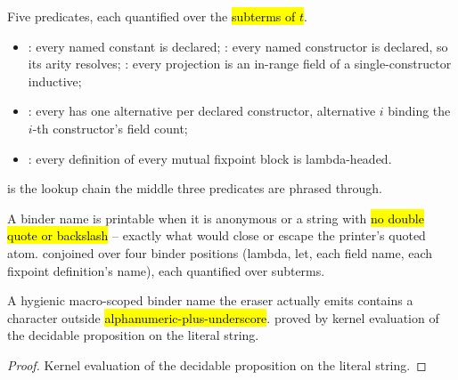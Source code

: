 \begin{definition}
\label{def:NoDangling}
\leanok
{}
 Five predicates, each quantified over the \hl{subterms of $t$}.
\begin{itemize}
\item {}: every named constant is declared; : every named
constructor is declared, so its arity resolves; : every projection is an in-range
field of a single-constructor inductive;
\item {}: every  has one alternative per declared constructor,
alternative $i$ binding the $i$-th constructor's field count;
\item {}: every definition of every mutual fixpoint block is lambda-headed.
\end{itemize}
  is the lookup chain the middle three predicates are phrased through.
\end{definition}

\begin{definition}
\label{def:PrintableBinders}
\leanok
{}
 A binder name is printable when it is anonymous or a string with \hl{no double quote or
backslash} -- exactly what would close or escape the printer's quoted atom.
 conjoined over four binder positions (lambda, let, each  field name, each
fixpoint definition's name), each quantified over subterms.
\end{definition}

\begin{lemma}
\label{lem:hygienic_binder_not_alphanum}
\leanok
{}
 A hygienic macro-scoped binder name the eraser actually emits contains a character
outside \hl{alphanumeric-plus-underscore}.
 proved by kernel evaluation of the decidable proposition on the literal string.
\end{lemma}
\begin{proof}
\leanok
{} Kernel evaluation of the decidable proposition on the literal string.
\end{proof}

